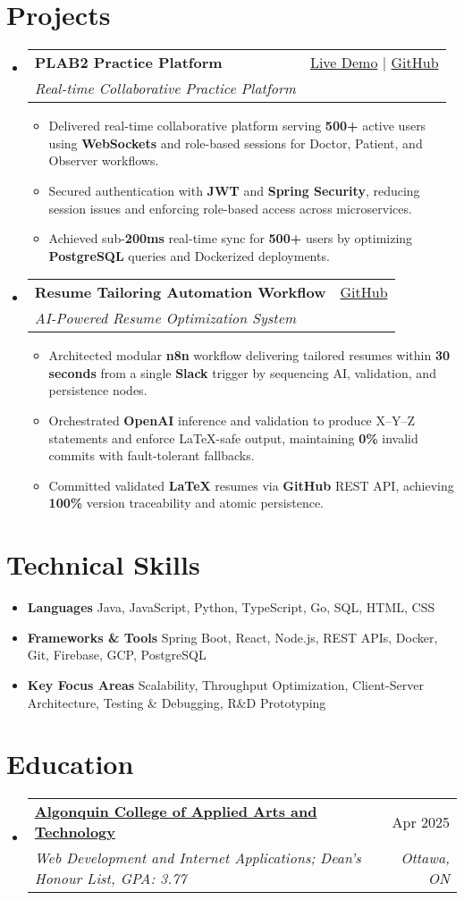 \documentclass[letterpaper,11pt]{article}
\makeatletter
\newcommand{\resumeItem}[1]{\item\small{#1 \vspace{-2pt}}}
\newcommand{\resumeSubheading}[4]{
  \vspace{-1pt}\item
    \begin{tabular*}{0.97\textwidth}[t]{l@{\extracolsep{\fill}}r}
      \textbf{#1} & #2 \\
      \textit{\small#3} & \textit{\small #4} \\
    \end{tabular*}\vspace{-5pt}
}
\newcommand{\resumeSubHeadingListStart}{\begin{itemize}[leftmargin=*]}
\newcommand{\resumeSubHeadingListEnd}{\end{itemize}}
\newcommand{\resumeItemListStart}{\begin{itemize}}
\newcommand{\resumeItemListEnd}{\end{itemize}\vspace{-5pt}}
\makeatother
\begin{document}
\section{Projects}
  \resumeSubHeadingListStart
    \resumeSubheading
      {\textbf{PLAB2 Practice Platform}}{\href{https://plab2practice.com}{Live Demo} | \href{https://github.com/altansaid/plab2projectnew}{GitHub}}
      {Real-time Collaborative Practice Platform}{}
      \resumeItemListStart
        \resumeItem{Delivered real-time collaborative platform serving \textbf{500+} active users using \textbf{WebSockets} and role-based sessions for Doctor, Patient, and Observer workflows.}
        \resumeItem{Secured authentication with \textbf{JWT} and \textbf{Spring Security}, reducing session issues and enforcing role-based access across microservices.}
        \resumeItem{Achieved sub-\textbf{200ms} real-time sync for \textbf{500+} users by optimizing \textbf{PostgreSQL} queries and Dockerized deployments.}
      \resumeItemListEnd

    \resumeSubheading
      {\textbf{Resume Tailoring Automation Workflow}}{\href{https://github.com/altansaid/resume-automation-workflow}{GitHub}}
      {AI-Powered Resume Optimization System}{}
      \resumeItemListStart
    \resumeItem{Architected modular \textbf{n8n} workflow delivering tailored resumes within \textbf{30 seconds} from a single \textbf{Slack} trigger by sequencing AI, validation, and persistence nodes.}
    \resumeItem{Orchestrated \textbf{OpenAI} inference and validation to produce X--Y--Z statements and enforce LaTeX-safe output, maintaining \textbf{0\%} invalid commits with fault-tolerant fallbacks.}
    \resumeItem{Committed validated \textbf{LaTeX} resumes via \textbf{GitHub} REST API, achieving \textbf{100\%} version traceability and atomic persistence.}



      \resumeItemListEnd
  \resumeSubHeadingListEnd

\section{Technical Skills}
  \resumeItemListStart
    \resumeItem{\textbf{Languages}}{Java, JavaScript, Python, TypeScript, Go, SQL, HTML, CSS}
    \resumeItem{\textbf{Frameworks \& Tools}}{Spring Boot, React, Node.js, REST APIs, Docker, Git, Firebase, GCP, PostgreSQL}
    \resumeItem{\textbf{Key Focus Areas}}{Scalability, Throughput Optimization, Client-Server Architecture, Testing \& Debugging, R\&D Prototyping}
  \resumeItemListEnd

\section{Education}
  \resumeSubHeadingListStart
    \resumeSubheading
      {\href{https://www.algonquincollege.com/sat/program/web-development-internet-applications/}{Algonquin College of Applied Arts and Technology}}{Apr 2025}
      {Web Development and Internet Applications; Dean's Honour List, GPA: 3.77}{Ottawa, ON}
  \resumeSubHeadingListEnd
\end{document}
